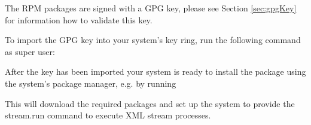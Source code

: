 The RPM packages are signed with a GPG key, please see Section
\ref{sec:gpgKey} for information how to validate this key.

To import the GPG key into your system's key ring, run the
following command as super user:


After the key has been imported your system is ready to install
the \streams package using the system's package manager, e.g.
by running


This will download the required packages and set up the system
to provide the {\ttfamily stream.run} command to execute XML
stream processes.